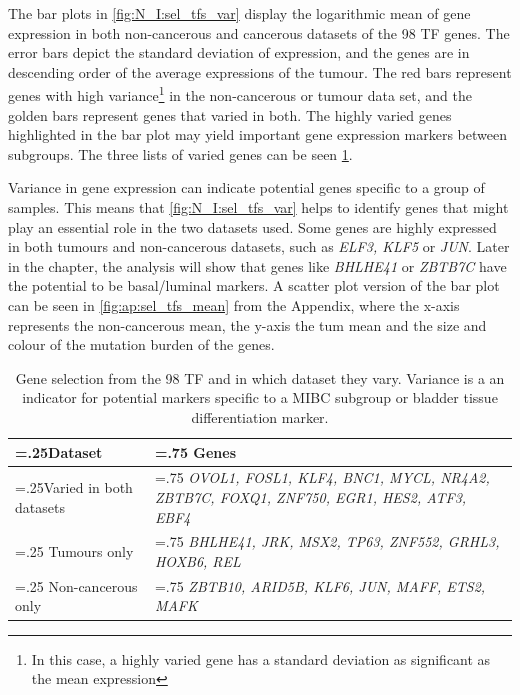 The bar plots in \cref{fig:N_I:sel_tfs_var} display the logarithmic mean of gene expression in both non-cancerous and cancerous datasets of the 98 TF genes. The error bars depict the standard deviation of expression, and the genes are in descending order of the average expressions of the tumour. The red bars represent genes with high variance\footnote{In this case, a highly varied gene has a standard deviation as significant as the mean expression} in the non-cancerous or tumour data set, and the golden bars represent genes that varied in both. The highly varied genes highlighted in the bar plot may yield important gene expression markers between subgroups. The three lists of varied genes can be seen \cref{tab:N_I:sel_tfs_var}.


Variance in gene expression can indicate potential genes specific to a group of samples. This means that \cref{fig:N_I:sel_tfs_var} helps to identify genes that might play an essential role in the two datasets used. Some genes are highly expressed in both tumours and non-cancerous datasets, such as \textit{ELF3, KLF5} or \textit{JUN}. Later in the chapter, the analysis will show that genes like \textit{BHLHE41} or \textit{ZBTB7C} have the potential to be basal/luminal markers. A scatter plot version of the bar plot can be seen in \cref{fig:ap:sel_tfs_mean} from the Appendix, where the x-axis represents the non-cancerous mean, the y-axis the tum mean and the size and colour of the mutation burden of the genes.


\begin{table}[!t]
  \centering
  \small
  \begin{tabularx}{\textwidth}{>{\hsize=.25\hsize}X|>{\hsize=.75\hsize}X}
    \toprule
    \textbf{Dataset} & \textbf{Genes} \\
    \midrule
    Varied in both datasets & \textit{OVOL1, FOSL1, KLF4, BNC1, MYCL, NR4A2, ZBTB7C, FOXQ1, ZNF750, EGR1, HES2, ATF3, EBF4} \\
    \midrule
    Tumours only & \textit{BHLHE41, JRK, MSX2, TP63, ZNF552, GRHL3, HOXB6, REL} \\
    \midrule
    Non-cancerous only & \textit{ZBTB10, ARID5B, KLF6, JUN, MAFF, ETS2, MAFK} \\
    \bottomrule
  \end{tabularx}
    \caption[Summary of the subset of 98 TF which are highly varied]{Gene selection from the 98 TF and in which dataset they vary. Variance is a an indicator for potential markers specific to a MIBC subgroup or bladder tissue differentiation marker.}
    \label{tab:N_I:sel_tfs_var}
\end{table}



